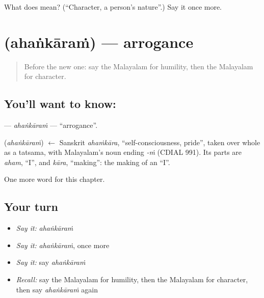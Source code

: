 \begin{tcolorbox}[breakable,colback=teal!4,colframe=teal!35!black,title={Before you move on}]
What does  mean? (\textquotedblleft{}Character, a person's nature\textquotedblright{}.) Say it once more.
\end{tcolorbox}
\section[\texorpdfstring{\ml{അഹങ്കാരം} (ahaṅkāraṁ)}{അഹങ്കാരം (ahaṅkāraṁ)}]{ (ahaṅkāraṁ) — arrogance}

\label{lesson:ML-C319-ahankaram}



\begin{quote}
Before the new one: say the Malayalam for humility, then the Malayalam for character.
\end{quote}

\subsection*{You'll want to know: }
\textbf{} — \emph{ahaṅkāraṁ} — \textquotedblleft{}arrogance\textquotedblright{}.

\begin{cousinweb}
\textbf{} (\emph{ahaṅkāraṁ}) $\leftarrow$ Sanskrit \emph{ahaṁkāra}, \textquotedblleft{}self-consciousness, pride\textquotedblright{}, taken over whole as a tatsama, with Malayalam's noun ending \emph{-ṁ} (CDIAL 991). Its parts are \emph{aham}, \textquotedblleft{}I\textquotedblright{}, and \emph{kāra}, \textquotedblleft{}making\textquotedblright{}: the making of an \textquotedblleft{}I\textquotedblright{}.
\end{cousinweb}

\begin{grammarlens}[title={What you've built}]
One more word for this chapter.
\end{grammarlens}

\subsection*{Your turn}
\begin{itemize}
\raggedright
  \item \emph{Say it:} \emph{ahaṅkāraṁ}
  \item \emph{Say it:} \emph{ahaṅkāraṁ}, once more
  \item \emph{Say it:} say \emph{ahaṅkāraṁ}
  \item \emph{Recall:} say the Malayalam for humility, then the Malayalam for character, then say \emph{ahaṅkāraṁ} again
\end{itemize}

